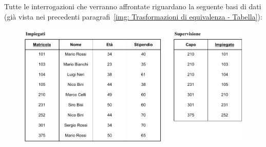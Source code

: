 \documentclass[a4paper]{article}
\begin{document}
	Tutte le interrogazioni che verranno affrontate riguardano la seguente basi di dati (già vista nei precedenti paragrafi~\ref{img: Trasformazioni di equivalenza - Tabella}):
	\begin{figure}[!htp]
		\centering
		\includegraphics[width=\textwidth]{img/equivalenza_espressioni_algebriche.pdf}
	\end{figure}
\end{document}
